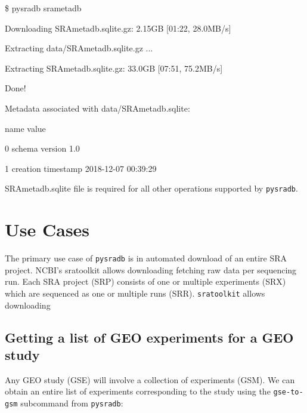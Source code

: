 \documentclass[9pt,a4paper]{extarticle}
\newenvironment{allintypewriter}{\ttfamily}{\par}
\begin{document}
\begin{allintypewriter}
\$ pysradb srametadb

Downloading SRAmetadb.sqlite.gz: 2.15GB [01:22, 28.0MB/s]   

Extracting data/SRAmetadb.sqlite.gz ...

Extracting SRAmetadb.sqlite.gz: 33.0GB [07:51, 75.2MB/s]

Done!

Metadata associated with data/SRAmetadb.sqlite:

                 name                value

0      schema version                  1.0

1  creation timestamp  2018-12-07 00:39:29

\end{allintypewriter}

SRAmetadb.sqlite file is required for all other operations supported
by \texttt{pysradb}.


\section*{Use Cases} %
The primary use case of \texttt{pysradb} is in automated download of an entire
SRA project. NCBI's sratoolkit \cite{ncbisratoolit} allows downloading fetching 
raw data per sequencing run. Each SRA project (SRP) consists of one or multiple 
experiments (SRX) which are sequenced as one or multiple runs (SRR). 
\texttt{sratoolkit} allows downloading 


\subsection*{Getting a list of GEO experiments for a GEO study}
Any GEO study (GSE) will involve a collection of experiments (GSM). We can obtain
an entire list of experiments corresponding to the study using the
\texttt{gse-to-gsm} subcommand from \texttt{pysradb}:
\end{document}
